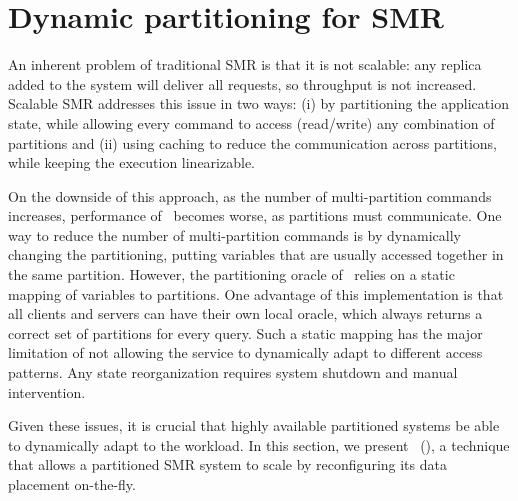 \chapter[Dynamic partitioning for SMR]{Dynamic partitioning for SMR}
\label{sec:dssmr}

An inherent problem of traditional SMR is that it is not scalable: any replica
added to the system will deliver all requests, so throughput is not increased.
Scalable SMR addresses this issue in two ways: (i) by partitioning the
application state, while allowing every command to access (read/write) any
combination of partitions and (ii) using caching to reduce the communication
across partitions, while keeping the execution linearizable.

On the downside of this approach, as the number of multi-partition commands
increases, performance of \ssmr\ becomes worse, as partitions must communicate.
One way to reduce the number of multi-partition commands is by dynamically
changing the partitioning, putting variables that are usually accessed together
in the same partition. However, the partitioning oracle of \ssmr\ relies on a
static mapping of variables to partitions. One advantage of this implementation
is that all clients and servers can have their own local oracle, which always
returns a correct set of partitions for every query. Such a static mapping has
the major limitation of not allowing the service to dynamically adapt to
different access patterns. Any state reorganization requires system shutdown and
manual intervention.

Given these issues, it is crucial that highly available partitioned systems be
able to dynamically adapt to the workload. In this section, we present
\dssmrlong\ (\dssmr), a technique that allows a partitioned SMR system to scale
by reconfiguring its data placement on-the-fly.

\section{\dssmrlong}
\label{sec:dssmridea}

